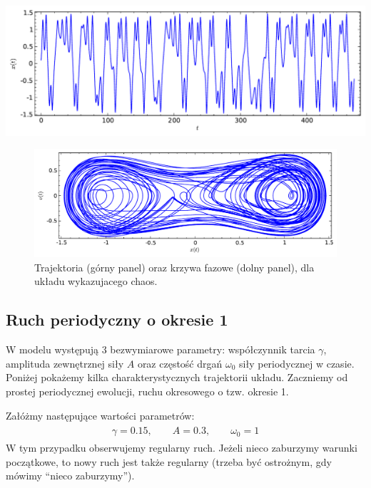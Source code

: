 \documentclass[a4paper,12pt,polish]{sphinxmanual}
\begin{document}
{\hfill\includegraphics{sage_chII011_05a.pdf}\hfill}
\begin{figure}[htbp]
\centering
\capstart

\includegraphics{sage_chII011_05b.pdf}
\caption{Trajektoria (górny panel) oraz krzywa fazowe (dolny panel),
dla układu wykazujacego chaos.}\end{figure}


\subsection{Ruch periodyczny o okresie 1}
\label{ch2/chII011:ruch-periodyczny-o-okresie-1}
W modelu występują 3 bezwymiarowe parametry: współczynnik tarcia $\gamma$, amplituda zewnętrznej siły $A$ oraz częstość drgań $\omega_0$ siły periodycznej w czasie. Poniżej pokażemy kilka charakterystycznych trajektorii układu. Zaczniemy od prostej periodycznej ewolucji, ruchu okresowego o tzw. okresie 1.

Załóżmy następujące wartości parametrów:
\label{ch2/chII011:equation-eqn19}\begin{gather}
\begin{split}\gamma = 0.15, \qquad A = 0.3, \qquad \omega_0 = 1\end{split}\label{ch2/chII011-eqn19}
\end{gather}
W tym przypadku obserwujemy regularny ruch. Jeżeli nieco zaburzymy warunki początkowe, to nowy ruch jest także regularny (trzeba być ostrożnym, gdy mówimy ``nieco zaburzymy'').
\end{document}

